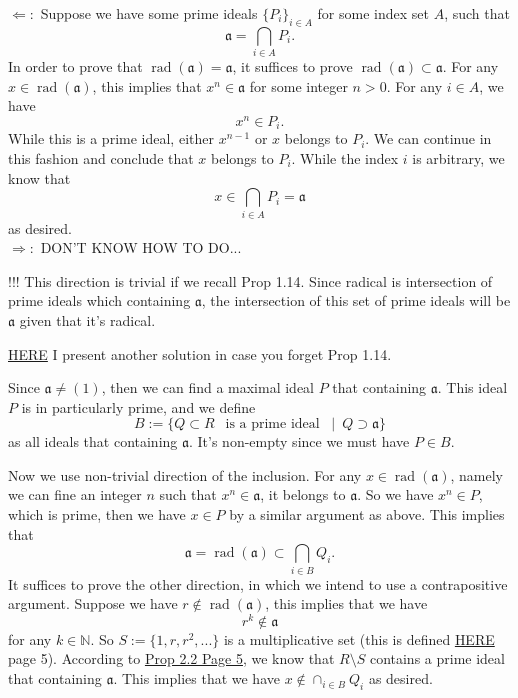 $\Leftarrow:$ Suppose we have some prime ideals $\{P_i\}_{i\in A}$ for some index set $A$, such that 
$$\mathfrak a=\bigcap _{i\in A} P_i.$$
In order to prove that $\operatorname{rad}(\mathfrak a)=\mathfrak a$, it suffices to prove $\operatorname{rad}(\mathfrak a)\subset \mathfrak a$.
For any $x\in \operatorname{rad}(\mathfrak a)$, this implies that $x^n\in\mathfrak a$ for some integer $n>0$. For any $i\in A$, we have 
$$x^n\in P_i.$$
While this is a prime ideal, either $x^{n-1}$ or $x$ belongs to $P_i$. We can continue in this fashion and conclude that $x$ belongs to $P_i$. While the index $i$ is arbitrary, we know that $$x\in \bigcap _{i\in A}P_i=\mathfrak a$$ as desired.\\

\noindent$\Rightarrow:$ DON'T KNOW HOW TO DO... 

!!! This direction is trivial if we recall Prop 1.14. Since radical is intersection of prime ideals which containing $\mathfrak a$, the intersection of this set of prime ideals will be $\mathfrak a$ given that it's radical.


\href{https://math.stackexchange.com/questions/49309/intersection-of-prime-ideals}{HERE} I present another solution in case you forget Prop 1.14.

Since $\mathfrak a\neq (1)$, then we can find a maximal ideal $P$ that containing $\mathfrak a$. This ideal $P$ is in particularly prime, and we define 
$$B:=\{Q\subset R ~~\text{ is a prime ideal }~\mid~ Q\supset \mathfrak a\}$$
as all ideals that containing $\mathfrak a$. It's non-empty since we must have $P\in B$. 

Now we use non-trivial direction of the inclusion. For any $x\in \operatorname{rad}(\mathfrak a)$, namely we can fine an integer $n$ such that $x^n\in \mathfrak a$, it belongs to $\mathfrak a$. So we have $x^n\in P$, which is prime, then we have $x\in P$ by a similar argument as above. This implies that 
$$\mathfrak a=\operatorname{rad}(\mathfrak a)\subset \bigcap_{i\in B}Q_i.$$
It suffices to prove the other direction, in which we intend to use a contrapositive argument. Suppose we have $r\notin \operatorname{rad}(\mathfrak a)$, this implies that we have 
$$r^k\notin \mathfrak a$$ for any $k\in \mathbb N$. So $S:=\{1,r,r^2,...\}$ is a multiplicative set (this is defined \href{https://www.jmilne.org/math/xnotes/CA.pdf}{HERE} page 5). 
According to \href{https://www.jmilne.org/math/xnotes/CA.pdf}{Prop 2.2 Page 5}, we know that $R\setminus S$ contains a prime ideal that containing $\mathfrak a$. This implies that we have $x\notin \cap_{i\in B}Q_i$ as desired.



